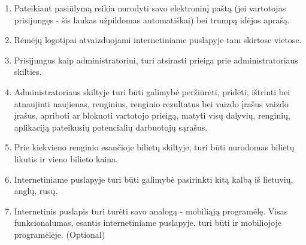 \documentclass{VUMIFPSkursinis}
\begin{document}
\begin{enumerate}
			\item Pateikiant pasiūlymą reikia nurodyti savo elektroninį paštą (jei vartotojas prisijungęs - šis laukas užpildomas automatiškai) bei trumpą idėjos aprašą.
			\item Rėmėjų logotipai atvaizduojami internetiniame puslapyje tam skirtose vietose.
			\item Prisijungus kaip administratoriui, turi atsirasti prieiga prie administratoriaus skilties.
			\item Administratoriaus skiltyje turi būti galimybė peržiūrėti, pridėti, ištrinti bei atnaujinti naujienas, renginius, renginio rezultatus bei vaizdo įrašus vaizdo įrašus, apriboti ar blokuoti vartotojo prieigą, matyti visų dalyvių, renginių, aplikaciją pateikusių potencialių darbuotojų sąrašus.
			\item Prie kiekvieno renginio esančioje bilietų skiltyje, turi būti nurodomas bilietų likutis ir vieno bilieto kaina.
			\item Internetiniame puslapyje turi būti galimybė pasirinkti kitą kalbą iš lietuvių, anglų, rusų.
			\item Internetinis puslapis turi turėti savo analogą - mobiliąją programėlę. Visas funkcionalumas, esantis internetiniame puslapyje, turi būti ir mobiliojoje programėlėje. (Optional)
		\end{enumerate}
		
\end{document}
